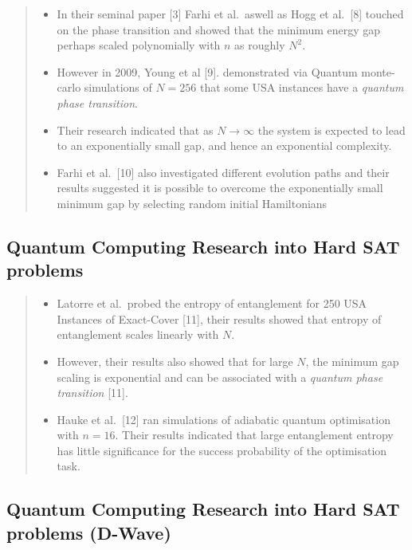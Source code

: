\documentclass[
]{article}
\providecommand{\tightlist}{%
  \setlength{\itemsep}{0pt}\setlength{\parskip}{0pt}}
\begin{document}
\begin{quote}
\begin{itemize}
\tightlist
\item
  In their seminal paper {[}3{]} Farhi et al.~aswell as Hogg et
  al.~{[}8{]} touched on the phase transition and showed that the
  minimum energy gap perhaps scaled polynomially with \(n\) as roughly
  \(N^2\).
\item
  However in 2009, Young et al {[}9{]}. demonstrated via Quantum
  monte-carlo simulations of \(N=256\) that some USA instances have a
  \emph{quantum phase transition}.
\item
  Their research indicated that as \(N \rightarrow \infty\) the system
  is expected to lead to an exponentially small gap, and hence an
  exponential complexity.
\item
  Farhi et al.~{[}10{]} also investigated different evolution paths and
  their results suggested it is possible to overcome the exponentially
  small minimum gap by selecting random initial Hamiltonians
\end{itemize}
\end{quote}

\hypertarget{quantum-computing-research-into-hard-sat-problems-1}{%
\subsection{Quantum Computing Research into Hard SAT
problems}\label{quantum-computing-research-into-hard-sat-problems-1}}

\begin{quote}
\begin{itemize}
\tightlist
\item
  Latorre et al.~probed the entropy of entanglement for 250 USA
  Instances of Exact-Cover {[}11{]}, their results showed that entropy
  of entanglement scales linearly with \(N\).
\item
  However, their results also showed that for large \(N\), the minimum
  gap scaling is exponential and can be associated with a \emph{quantum
  phase transition} {[}11{]}.
\item
  Hauke et al.~{[}12{]} ran simulations of adiabatic quantum
  optimisation with \(n=16\). Their results indicated that large
  entanglement entropy has little significance for the success
  probability of the optimisation task.
\end{itemize}
\end{quote}

\hypertarget{quantum-computing-research-into-hard-sat-problems-d-wave}{%
\subsection{Quantum Computing Research into Hard SAT problems
(D-Wave)}\label{quantum-computing-research-into-hard-sat-problems-d-wave}}
\end{document}
